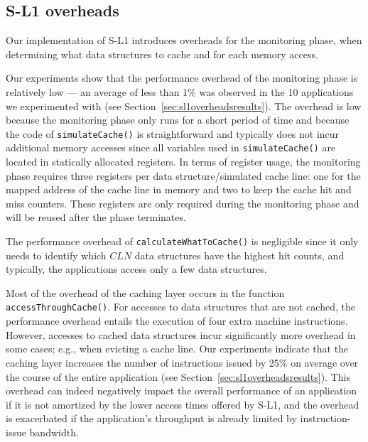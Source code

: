 \subsection{S-L1 overheads}
Our implementation of S-L1 introduces overheads for the monitoring phase, when determining what data structures to cache and for each memory access.


Our experiments show that the performance overhead of the monitoring phase is relatively low --- an
average of less than 1\% was observed in the 10 applications we experimented with (see
Section~\ref{sec:sl1overheadsresults}). 
The overhead is low because the monitoring phase only runs for a short period of time and because
the code of \texttt{simulateCache()} is straightforward and typically does not incur additional
memory accesses since all variables used in \texttt{simulateCache()} are located in statically
allocated registers. 
In terms of register usage, the monitoring phase requires three registers per data structure/simulated
cache line: one for the mapped address of the cache line in memory and two to keep the cache hit and
miss counters. 
These registers are only required during the monitoring phase and will be reused after
the phase terminates.


The performance overhead of \texttt{calculateWhatToCache()} is
negligible since it only needs to identify which $CLN$ data structures have the highest hit counts,
and typically, the applications access only a few data structures.

Most of the overhead of the caching layer occurs in the function \texttt{accessThroughCache()}. 
For accesses to data structures that are not cached, the performance overhead entails
the execution of four extra machine instructions.
However, accesses to cached data structures incur significantly more overhead in some cases; e.g., when evicting a cache line.
Our experiments indicate that the caching layer increases the number of instructions issued by 25\%
on average over the course of the entire application (see Section~\ref{sec:sl1overheadsresults}).
This overhead can indeed negatively impact the overall performance of an application if it is not
amortized by the lower access times offered by S-L1, and the overhead is exacerbated if the
application's throughput is already limited by instruction-issue bandwidth.

